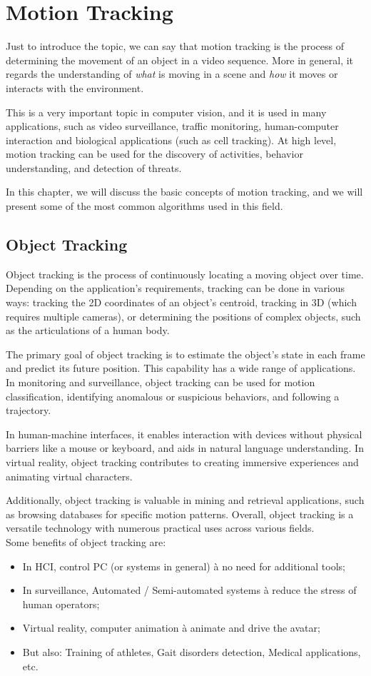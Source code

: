 \chapter{Motion Tracking}
Just to introduce the topic, we can say that motion tracking is the process of determining the movement of an object in a video sequence. 
More in general, it regards the understanding of \textit{what} is moving in a scene and \textit{how} it moves or interacts with the environment.

This is a very important topic in computer vision, and it is used in many applications, such as video surveillance, traffic monitoring, human-computer interaction and biological applications (such as cell tracking). 
At high level, motion tracking can be used for the discovery of activities, behavior understanding, and detection of threats.

In this chapter, we will discuss the basic concepts of motion tracking, and we will present some of the most common algorithms used in this field.

\section{Object Tracking}
Object tracking is the process of continuously locating a moving object over time. 
Depending on the application's requirements, tracking can be done in various ways: tracking the 2D coordinates of an object's centroid, tracking in 3D (which requires multiple cameras), or determining the positions of complex objects, such as the articulations of a human body.

The primary goal of object tracking is to estimate the object's state in each frame and predict its future position. 
This capability has a wide range of applications. In monitoring and surveillance, object tracking can be used for motion classification, identifying anomalous or suspicious behaviors, and following a trajectory.

In human-machine interfaces, it enables interaction with devices without physical barriers like a mouse or keyboard, and aids in natural language understanding. 
In virtual reality, object tracking contributes to creating immersive experiences and animating virtual characters.

Additionally, object tracking is valuable in mining and retrieval applications, such as browsing databases for specific motion patterns. 
Overall, object tracking is a versatile technology with numerous practical uses across various fields.
\\
Some benefits of object tracking are:
\begin{itemize}
\item In HCI, control PC (or systems in general) à no need for additional tools;
\item In surveillance, Automated / Semi-automated systems à reduce the stress of human operators;
\item Virtual reality, computer animation à animate and drive the avatar;
\item But also: Training of athletes, Gait disorders detection, Medical applications, etc.
\end{itemize}

